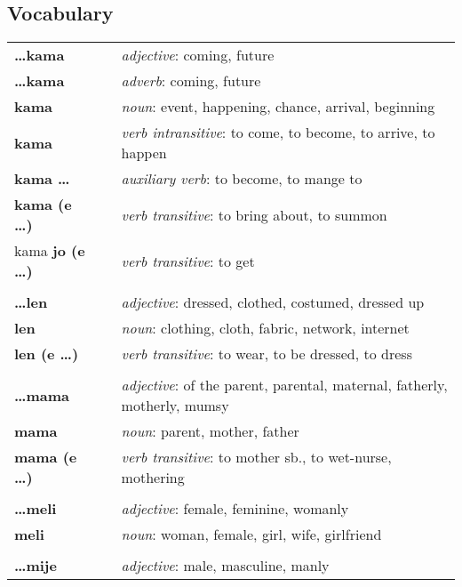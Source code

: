 \subsection*{Vocabulary}
\begin{supertabular}{p{2,5cm}|ll}
\textbf{\dots kama} && \textit{adjective}: coming, future \\ %
\textbf{\dots kama} && \textit{adverb}: coming, future \\ %
\textbf{kama} && \textit{noun}: event, happening, chance, arrival, beginning \\ %
\textbf{kama} && \textit{verb intransitive}: to come, to become, to arrive, to happen \\ %
\textbf{kama \dots} && \textit{auxiliary verb}: to become, to mange to \\ %
\textbf{kama (e \dots)} && \textit{verb transitive}: to bring about, to summon \\ %
kama \textbf{jo (e \dots)} && \textit{verb transitive}: to get \\ %
 && \\ %
\textbf{\dots len} && \textit{adjective}: dressed, clothed, costumed, dressed up \\ %
\textbf{len} && \textit{noun}: clothing, cloth, fabric, network, internet \\ %
\textbf{len (e \dots)} && \textit{verb transitive}: to wear, to be dressed, to dress \\ %
 && \\ %
\textbf{\dots mama} && \textit{adjective}: of the parent, parental, maternal, fatherly, motherly, mumsy \\ %
\textbf{mama} && \textit{noun}: parent, mother, father \\ %
\textbf{mama (e \dots)} && \textit{verb transitive}: to mother sb., to wet-nurse, mothering \\ %
 && \\ %
\textbf{\dots meli} && \textit{adjective}: female, feminine, womanly \\ %
\textbf{meli} && \textit{noun}: woman, female, girl, wife, girlfriend \\ %
 && \\ %
\textbf{\dots mije} && \textit{adjective}: male, masculine, manly \\ %

\end{supertabular}
